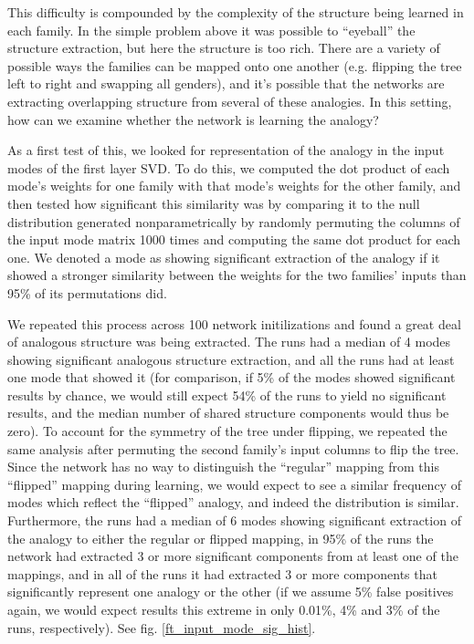 \documentclass[10pt,letterpaper]{article}
\begin{document}
This difficulty is compounded by the complexity of the structure being learned in each family. In the simple problem above it was possible to ``eyeball'' the structure extraction, but here the structure is too rich. There are a variety of possible ways the families can be mapped onto one another (e.g. flipping the tree left to right and swapping all genders), and it's possible that the networks are extracting overlapping structure from several of these analogies. In this setting, how can we examine whether the network is learning the analogy? \par
As a first test of this, we looked for representation of the analogy in the input modes of the first layer SVD. To do this, we computed the dot product of each mode's weights for one family with that mode's weights for the other family, and then tested how significant this similarity was by comparing it to the null distribution generated nonparametrically by randomly permuting the columns of the input mode matrix 1000 times and computing the same dot product for each one. We denoted a mode as showing significant extraction of the analogy if it showed a stronger similarity between the weights for the two families' inputs than 95\% of its permutations did. \par
We repeated this process across 100 network initilizations and found a great deal of analogous structure was being extracted. The runs had a median of 4 modes showing significant analogous structure extraction, and all the runs had at least one mode that showed it (for comparison, if 5\% of the modes showed significant results by chance, we would still expect 54\% of the runs to yield no significant results, and the median number of shared structure components would thus be zero). To account for the symmetry of the tree under flipping, we repeated the same analysis after permuting the second family's input columns to flip the tree. Since the network has no way to distinguish the ``regular'' mapping from this ``flipped'' mapping during learning, we would expect to see a similar frequency of modes which reflect the ``flipped'' analogy, and indeed the distribution is similar. Furthermore, the runs had a median of 6 modes showing significant extraction of the analogy to either the regular or flipped mapping, in 95\% of the runs the network had extracted 3 or more significant components from at least one of the mappings, and in all of the runs it had extracted 3 or more components that significantly represent one analogy or the other (if we assume 5\% false positives again, we would expect results this extreme in only 0.01\%, 4\% and 3\% of the runs, respectively). See fig. \ref{ft_input_mode_sig_hist}. \par
\end{document}
